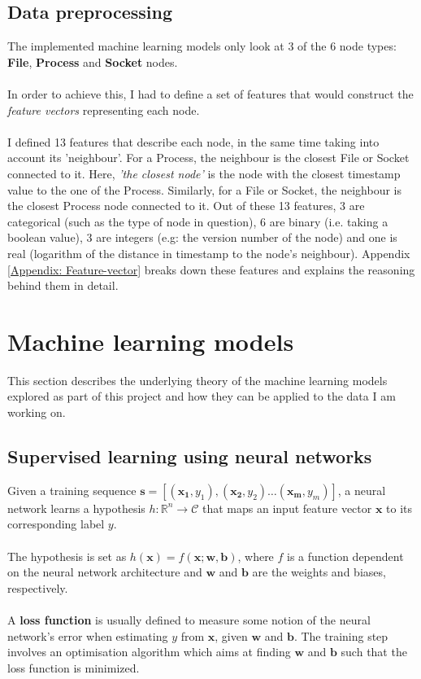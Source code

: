 	\subsection{Data preprocessing} \label{Section: prep/data/feature-vectors}
	The implemented machine learning models only look at 3 of the 6 node types: \textbf{File}, \textbf{Process} and \textbf{Socket} nodes. 
	\\ \\
	In order to achieve this, I had to define a set of features that would construct the \textit{feature vectors} representing each node. 
	\\ \\
	I defined 13 features that describe each node, in the same time taking into account its 'neighbour'. For a Process, the neighbour is the closest File or Socket connected to it. Here, \textit{'the closest node'} is the node with the closest timestamp value to the one of the Process. Similarly, for a File or Socket, the neighbour is the closest Process node connected to it. Out of these 13 features, 3 are categorical (such as the type of node in question), 6 are binary (i.e. taking a boolean value), 3 are integers (e.g: the version number of the node) and one is real (logarithm of the distance in timestamp to the node's neighbour). Appendix \ref{Appendix: Feature-vector} breaks down these features and explains the reasoning behind them in detail.

	\section{Machine learning models} \label{Section 2.2}
	This section describes the underlying theory of the machine learning models explored as part of this project and how they can be applied to the data I am working on.

	\subsection{Supervised learning using neural networks} \label{Section 2.2.2}
	Given a training sequence $\mathbf{s} = [(\mathbf{x_1}, y_1), (\mathbf{x_2}, y_2) \dots (\mathbf{x_m}, y_m)]$, a neural network learns a hypothesis $h: \mathbb{R}^n \rightarrow \mathcal{C}$ that maps an input feature vector $\mathbf{x}$ to its corresponding label $y$. 
	\\ \\ 
	The hypothesis is set as $h(\mathbf{x}) = f(\mathbf{x}; \mathbf{w}, \mathbf{b})$, where $f$ is a function dependent on the neural network architecture and $\mathbf{w}$ and $\mathbf{b}$ are the weights and biases, respectively. 
	\\ \\
	A \textbf{loss function} is usually defined to measure some notion of the neural network's error when estimating $y$ from $\mathbf{x}$, given $\mathbf{w}$ and $\mathbf{b}$. The training step involves an optimisation algorithm which aims at finding $\mathbf{w}$ and $\mathbf{b}$ such that the loss function is minimized. 
	
